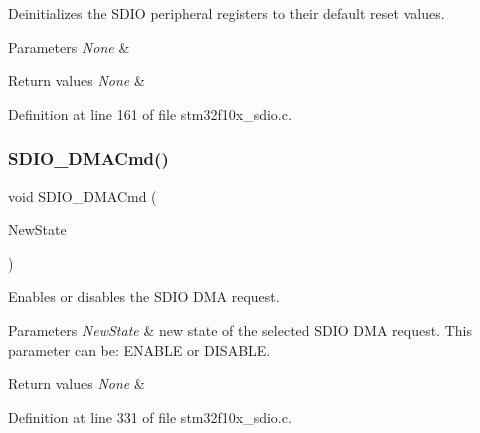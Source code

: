 Deinitializes the S\+D\+IO peripheral registers to their default reset values. 


\begin{DoxyParams}{Parameters}
{\em None} & \\
\hline
\end{DoxyParams}

\begin{DoxyRetVals}{Return values}
{\em None} & \\
\hline
\end{DoxyRetVals}


Definition at line 161 of file stm32f10x\+\_\+sdio.\+c.

\mbox{\label{group___s_d_i_o___exported___functions_gad36fde5ec0ce0c2089b9d971c2271e6e}} 
\subsubsection{\texorpdfstring{S\+D\+I\+O\+\_\+\+D\+M\+A\+Cmd()}{SDIO\_DMACmd()}}
{\footnotesize\ttfamily void S\+D\+I\+O\+\_\+\+D\+M\+A\+Cmd (\begin{DoxyParamCaption}\item[{\hyperlink{group___exported__types_gac9a7e9a35d2513ec15c3b537aaa4fba1}{Functional\+State}}]{New\+State }\end{DoxyParamCaption})}



Enables or disables the S\+D\+IO D\+MA request. 


\begin{DoxyParams}{Parameters}
{\em New\+State} & new state of the selected S\+D\+IO D\+MA request. This parameter can be\+: E\+N\+A\+B\+LE or D\+I\+S\+A\+B\+LE. \\
\hline
\end{DoxyParams}

\begin{DoxyRetVals}{Return values}
{\em None} & \\
\hline
\end{DoxyRetVals}


Definition at line 331 of file stm32f10x\+\_\+sdio.\+c.

